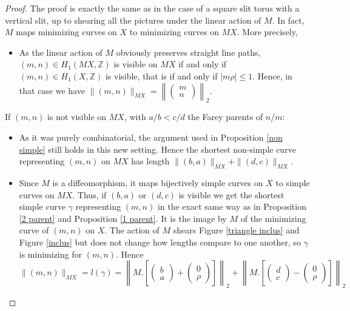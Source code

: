 \documentclass{article}
\newcommand{\ZZ}{\mathbb{Z}}
\theoremstyle{definition}
\begin{document}
\begin{proof}

The proof is exactly the same as in the case of a square slit torus with a vertical slit, up to shearing all the pictures under the linear action of $M$. In fact, $M$ maps minimizing curves on $X$ to minimizing curves on $MX$. More precisely,
\begin{itemize}\renewcommand{\labelitemi}{$\bullet$}
\item As the linear action of $M$ obviously preserves straight line paths, $(m,n)\in H_1(MX,\ZZ)$ is visible on $MX$ if and only if $(m,n)\in H_1(X,\ZZ)$ is visible, that is if and only if $|m\rho|\le 1$. Hence, in that case we have $\| (m,n)\|_{MX} = \left \|\begin{pmatrix} m \\ n \end{pmatrix} \right \| _ 2$. 
\end{itemize}

 If $(m,n)$ is not visible on $MX$, with $a/b<c/d$ the Farey parents of $n/m$:

\begin{itemize}\renewcommand{\labelitemi}{$\bullet$}
\item As it was purely combinatorial, the argument used in Proposition \ref{non simple} still holds in this new setting. Hence the shortest non-simple curve representing $(m,n)$ on $MX$ has length $\|(b,a)\|_{MX}+\|(d,c)\|_{MX}$.



\item Since $M$ is a diffeomorphism, it maps bijectively simple curves on $X$ to simple curves on $MX$. Thus, if $(b,a)$ or $(d,c)$ is visible we get the shortest simple curve $\gamma$ representing $(m,n)$ in the exact same way as in Proposition \ref{2 parent} and Proposition \ref{1 parent}. It is the image by $M$ of the minimizing curve of $(m,n)$ on $X$. The action of $M$ shears Figure \ref{triangle inclus} and Figure \ref{inclus} but does not change how lengths compare to one another, so $\gamma$ is minimizing for $(m,n)$. Hence $$ \|(m,n)\|_{MX}= l(\gamma) = \left \| M. \left [\begin{pmatrix} b \\ a \end{pmatrix} + \begin{pmatrix} 0 \\ \rho \end{pmatrix} \right ] \right \|_2 + \left \| M.\left [ \begin{pmatrix} d \\ c \end{pmatrix} - \begin{pmatrix} 0 \\\rho\end{pmatrix} \right ] \right \|_2 $$



\end{itemize}
\end{proof}
\end{document}
